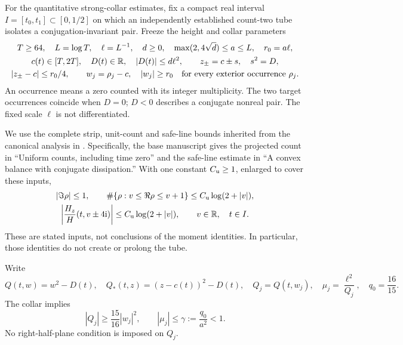 For the quantitative strong-collar estimates,
fix a compact real interval $I=[t_0,t_1]\subset[0,1/2]$ on which an independently
established count-two tube isolates a conjugation-invariant pair. Freeze
the height and collar parameters
\begin{equation}
 \begin{gathered}
 T\ge64,\quad L=\log T,\quad \ell=L^{-1},\quad d\ge0,
 \quad \max(2,4\sqrt d)\le a\le L,\quad r_0=a\ell,\\
 c(t)\in[T,2T],\quad D(t)\in\mathbb R,\quad |D(t)|\le d\ell^2,\qquad
 z_\pm=c\pm s,\quad s^2=D,\\
 |z_\pm-c|\le r_0/4,\qquad
 w_j=\rho_j-c,\quad |w_j|\ge r_0
 \quad\text{for every exterior occurrence }\rho_j.
 \end{gathered}
 \label{eq:domain}
\end{equation}
An occurrence means a zero counted with its integer multiplicity.
The two target occurrences coincide when $D=0$; $D<0$ describes
a conjugate nonreal pair. The fixed scale $\ell$ is not differentiated.

We use the complete strip, unit-count and safe-line bounds inherited
from the canonical analysis in \cite{BakerBase,BakerGT41}. Specifically,
the base manuscript gives the projected count in ``Uniform counts,
including time zero'' and the safe-line estimate in ``A convex balance
with conjugate dissipation.'' With one
constant $C_{\mathrm u}\ge1$, enlarged to cover these inputs,
\begin{equation}
 \begin{gathered}
 |\Im\rho|\le1,\qquad
 \#\{\rho:v\le\Re\rho\le v+1\}\le C_{\mathrm u}\log(2+|v|),\\
 \left|\frac{H_z}{H}(t,v\pm4\mathrm i)\right|
       \le C_{\mathrm u}\log(2+|v|),\qquad v\in\mathbb R,\quad t\in I.
 \end{gathered}
 \label{eq:count-safe}
\end{equation}
These are stated inputs, not conclusions of the moment identities.
In particular, those identities do not create or prolong the tube.

Write
\begin{equation}
 Q(t,w)=w^2-D(t),\quad Q_*(t,z)=(z-c(t))^2-D(t),\quad
 Q_j=Q(t,w_j),\quad \mu_j=\frac{\ell^2}{Q_j},\quad q_0=\frac{16}{15}.
 \label{eq:quadratic}
\end{equation}
The collar implies
\begin{equation}
 |Q_j|\ge\frac{15}{16}|w_j|^2,\qquad
 |\mu_j|\le\gamma:=\frac{q_0}{a^2}<1.
 \label{eq:collar-kernel}
\end{equation}
No right-half-plane condition is imposed on $Q_j$.

